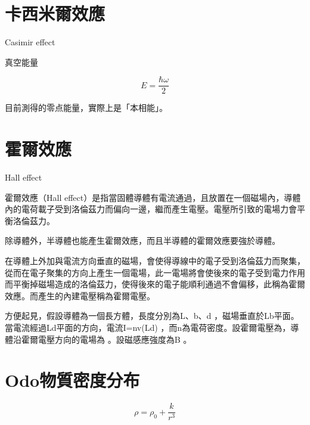 \documentclass[a4paper,notitlepage,UTF8]{ctexart}
\begin{document}
\section{卡西米爾效應}

Casimir effect

真空能量

\begin{large}
$$ E = \frac{\hbar\omega}{2} $$
\end{large}

目前測得的零点能量，實際上是「本相能」。




\section{霍爾效應}

Hall effect

霍爾效應（Hall effect）是指當固體導體有電流通過，且放置在一個磁場內，導體內的電荷載子受到洛倫茲力而偏向一邊，繼而產生電壓。電壓所引致的電場力會平衡洛倫茲力。

除導體外，半導體也能產生霍爾效應，而且半導體的霍爾效應要強於導體。

在導體上外加與電流方向垂直的磁場，會使得導線中的電子受到洛倫茲力而聚集，從而在電子聚集的方向上產生一個電場，此一電場將會使後來的電子受到電力作用而平衡掉磁場造成的洛倫茲力，使得後來的電子能順利通過不會偏移，此稱為霍爾效應。而產生的內建電壓稱為霍爾電壓。

方便起見，假設導體為一個長方體，長度分別為L、b、d ，磁場垂直於Lb平面。當電流經過Ld平面的方向，電流I=nv(Ld) ，而n為電荷密度。設霍爾電壓為，導體沿霍爾電壓方向的電場為 。設磁感應強度為B 。












\section{Odo物質密度分布}


\begin{large}
$$ \rho = \rho_{0} + \frac{k}{r^3} $$
\end{large}
\end{document}
